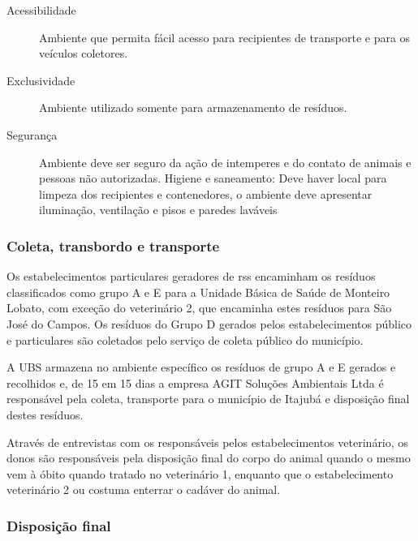 	\begin{description}
		\item [Acessibilidade] Ambiente que permita fácil acesso para recipientes de transporte e para os veículos coletores.
		\item[Exclusividade] Ambiente utilizado somente para armazenamento de resíduos.
		\item[Segurança] Ambiente deve ser seguro da ação de intemperes e do contato de animais e pessoas não autorizadas.
		Higiene e saneamento: Deve haver local para limpeza dos recipientes e contenedores, o ambiente deve apresentar iluminação, ventilação e pisos e paredes laváveis
	\end{description}

	\subsubsection{Coleta, transbordo e transporte} 
	Os estabelecimentos particulares geradores de \gls{rss} encaminham os resíduos classificados como grupo A e E para a Unidade Básica de Saúde de Monteiro Lobato, com exceção do veterinário 2, que encaminha estes resíduos para São José do Campos. Os resíduos do Grupo D gerados pelos estabelecimentos público e particulares são coletados pelo serviço de coleta público do município.
	
	A UBS armazena no ambiente específico os resíduos de grupo A e E gerados e recolhidos e, de 15 em 15 dias a empresa AGIT Soluções Ambientais Ltda é responsável pela coleta, transporte para o município de Itajubá e disposição final destes resíduos.
	
	
	Através de entrevistas com os responsáveis pelos estabelecimentos veterinário, os donos são responsáveis pela disposição final do corpo do animal quando o mesmo vem à óbito quando tratado no veterinário 1, enquanto que o estabelecimento veterinário 2 ou costuma enterrar o cadáver do animal.
	
	\subsubsection{Disposição final}
	
